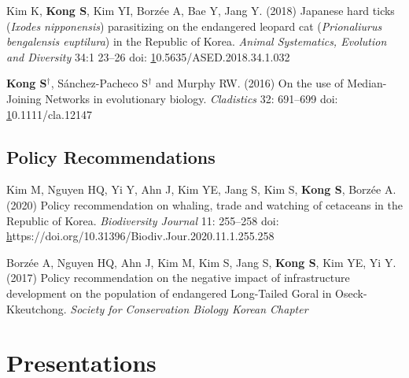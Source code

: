 \documentclass[11pt]{article}
\begin{document}
\begin{etaremune}
\item Kim K, \textbf{Kong S}, Kim YI, Borzée A, Bae Y, Jang Y. (2018) Japanese hard ticks (\textit{Ixodes nipponensis}) parasitizing on the endangered leopard cat (\textit{Prionaliurus bengalensis euptilura}) in the Republic of Korea. \textit{Animal Systematics, Evolution and Diversity} 34:1 23–26 doi: \href{10.5635/ASED.2018.34.1.032}10.5635/ASED.2018.34.1.032
\item \textbf{Kong S}{$^\dag$}, Sánchez-Pacheco S{$^\dag$} and Murphy RW. (2016) On the use of Median-Joining Networks in evolutionary biology. \textit{Cladistics} 32: 691–699 doi: \href{https://doi.org/10.1111/cla.12147}10.1111/cla.12147

\end{etaremune}

\subsection*{Policy Recommendations}
\begin{etaremune}

\item Kim M, Nguyen HQ, Yi Y, Ahn J, Kim YE, Jang S, Kim S, \textbf{Kong S}, Borzée A. (2020) Policy recommendation on whaling, trade and watching of cetaceans in the Republic of Korea. \textit{Biodiversity Journal} 11: 255–258 doi: \href{https://doi.org/10.31396/Biodiv.Jour.2020.11.1.255.258}https://doi.org/10.31396/Biodiv.Jour.2020.11.1.255.258
\item Borzée A, Nguyen HQ, Ahn J, Kim M, Kim S, Jang S, \textbf{Kong S}, Kim YE, Yi Y. (2017) Policy recommendation on the negative impact of infrastructure development on the population of endangered Long-Tailed Goral in Oseck-Kkeutchong. \textit{Society for Conservation Biology Korean Chapter}

\end{etaremune}

\hspace{0pt}

\section*{Presentations}
\end{document}
